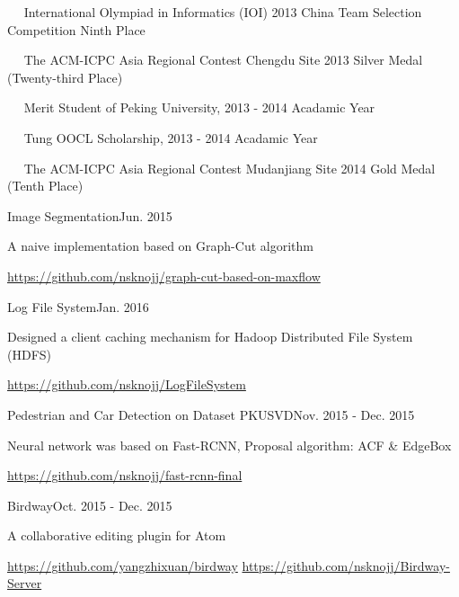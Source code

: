\documentclass{joel_cv}
\begin{document}
\begin{description}{}
	\item{\ \ } International Olympiad in Informatics (IOI) 2013 China Team Selection Competition Ninth Place
	\item{\ \ } The ACM-ICPC Asia Regional Contest Chengdu Site 2013 Silver Medal (Twenty-third Place)
	\item{\ \ } Merit Student of Peking University, 2013 - 2014 Acadamic Year
	\item{\ \ } Tung OOCL Scholarship, 2013 - 2014 Acadamic Year
	\item{\ \ } The ACM-ICPC Asia Regional Contest Mudanjiang Site 2014 Gold Medal (Tenth Place)
\end{description}


%
%


\begin{sectionContentSimple}{Image Segmentation}{Jun. 2015}
\item A naive implementation based on Graph-Cut algorithm
\item \url{https://github.com/nsknojj/graph-cut-based-on-maxflow}
\end{sectionContentSimple}

\begin{sectionContentSimple}{Log File System}{Jan. 2016}
\item Designed a client caching mechanism for Hadoop Distributed File System (HDFS)
\item \url{https://github.com/nsknojj/LogFileSystem}
\end{sectionContentSimple}

\begin{sectionContentSimple}{Pedestrian and Car Detection on Dataset PKUSVD}{Nov. 2015 - Dec. 2015}
\item Neural network was based on Fast-RCNN, Proposal algorithm: ACF \& EdgeBox
\item \url{https://github.com/nsknojj/fast-rcnn-final}
\end{sectionContentSimple}

\begin{sectionContentSimple}{Birdway}{Oct. 2015 - Dec. 2015}
\item A collaborative editing plugin for Atom
\item \url{https://github.com/yangzhixuan/birdway} \quad \url{https://github.com/nsknojj/Birdway-Server}
\end{sectionContentSimple}
\end{document}
